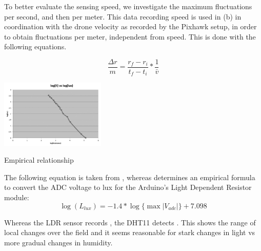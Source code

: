 \textbf{} To better evaluate the sensing speed, we investigate the maximum fluctuations per second, and then per meter. This data recording speed is used in (b) in coordination with the drone velocity as recorded by the Pixhawk setup, in order to obtain fluctuations per meter, independent from speed. This is done with the following equations.

\begin{equation}
{\frac{\Delta{r}}{{m}}} = 
{\frac{r_{f} - r_{i}}{t_{f} - t_{i}}}* {\frac{1}{\bar{v}}}
\end{equation}

\begin{marginfigure}%
    \raggedright
    \includegraphics[width=5cm]{images/stage_graphs/environment_results/lux_voltage.png}
    \caption{Empirical relationship \cite{ldr_testing} }
\end{marginfigure}

The following equation is taken from \cite{ldr_testing}, whereas  determines an empirical formula to convert the ADC voltage to lux for the Arduino's Light Dependent Resistor module:
\begin{equation}
    \log{(L_{lux})} = -1.4*\log\{ \max{ |{V_{adc}}| } \}+7.098
\end{equation}

Whereas the LDR sensor records , the DHT11 detects . This shows the range of local changes over the field and it seems reasonable for stark changes in light vs more gradual changes in humidity.





